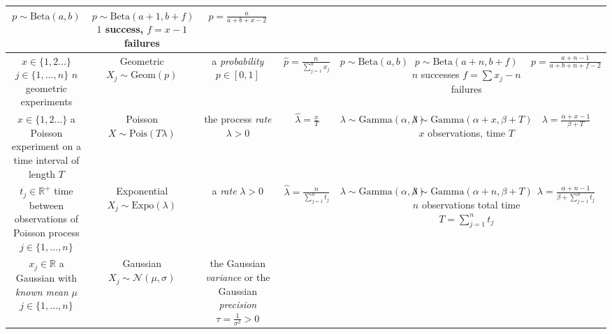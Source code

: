 \documentclass[10pt,landscape]{article}
\newcommand{\N}{\mathcal{N}}
\newcommand{\Beta}{\textrm{Beta}}
\newcommand{\Gam}{\textrm{Gamma}}
\newcommand{\Expo}{\textrm{Expo}}
\newcommand{\Pois}{\textrm{Pois}}
\newcommand{\Geom}{\textrm{Geom}}
\begin{document}
\begin{center}
\begin{tabular}{ccccccc}
  $p\sim \Beta(a,b)$ & \shortstack{$p\sim \Beta(a+1,b+f)$\\$1$ success, $f=x-1$ failures} &
  $p=\frac{a}{a+b+x-2}$
\\\hline
  \shortstack{$x\in \{1,2\dots\}$\\ $j\in\{1,\dots,n\}$ \\ $n$ geometric experiments}
  & \shortstack{Geometric \\ $X_j\sim\Geom(p)$} & \shortstack{a \emph{probability} \\ $p\in [0,1]$} &
  $\hat{p}=\frac{n}{\sum_{j=1}^n x_j}$ &
  $p\sim \Beta(a,b)$ & \shortstack{$p\sim \Beta(a+n,b+f)$\\$n$ successes \\ $f=\sum x_j-n$ failures} &
  $p=\frac{a+n-1}{a+b+n+f-2}$

\\\hline\hline
  \shortstack{$x\in \{1,2\dots\}$ \\ a Poisson experiment \\on a time interval of length $T$}&
  \shortstack{Poisson \\ $X\sim\Pois(T\lambda)$} &
  \shortstack{the process \emph{rate} \\ $\lambda>0$} &
  $\hat{\lambda}=\frac{x}{T}$ &
  $\lambda\sim \Gam(\alpha, \beta)$ & \shortstack{$\lambda\sim \Gam(\alpha + x, \beta + T)$\\$x$ observations, time $T$} &
  $\lambda=\frac{\alpha + x - 1}{\beta + T}$
\\\hline
  \shortstack{$t_j\in \mathbb{R}^+$ \\ time between observations of Poisson process\\$j\in\{1,\dots,n\}$}&
  \shortstack{Exponential \\ $X_j\sim\Expo(\lambda)$} & a \emph{rate} $\lambda>0$ &
  $\hat{\lambda}=\frac{n}{\sum_{j=1}^n t_j}$ &
  $\lambda\sim \Gam(\alpha, \beta)$ & \shortstack{$\lambda\sim \Gam(\alpha + n, \beta + T)$\\$n$ observations\\ total time $T=\sum_{j=1}^n t_j$} &
  $\lambda=\frac{\alpha + n - 1}{\beta + \sum_{j=1}^n t_j}$
  \\\hline\hline
  \shortstack{$x_j\in \mathbb{R}$ \\ a Gaussian with \emph{known mean} $\mu$\\$j\in\{1,\dots,n\}$}&
  \shortstack{Gaussian \\ $X_j\sim\N(\mu, \sigma)$} &
  \shortstack{the Gaussian \emph{variance} \\ or the Gaussian \emph{precision} \\ $\tau=\frac{1}{\sigma^2}>0$} &

\end{tabular}
\end{center}
\end{document}
